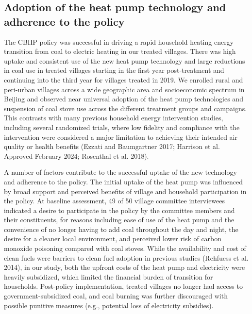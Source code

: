 \documentclass[
  letterpaper,
  DIV=11,
  numbers=noendperiod]{scrartcl}
\begin{document}
\hypertarget{adoption-of-the-heat-pump-technology-and-adherence-to-the-policy}{%
\subsection{Adoption of the heat pump technology and adherence to the
policy}\label{adoption-of-the-heat-pump-technology-and-adherence-to-the-policy}}

The CBHP policy was successful in driving a rapid household heating
energy transition from coal to electric heating in our treated villages.
There was high uptake and consistent use of the new heat pump technology
and large reductions in coal use in treated villages starting in the
first year post-treatment and continuing into the third year for
villages treated in 2019. We enrolled rural and peri-urban villages
across a wide geographic area and socioeconomic spectrum in Beijing and
observed near universal adoption of the heat pump technologies and
suspension of coal stove use across the different treatment groups and
campaigns. This contrasts with many previous household energy
intervention studies, including several randomized trials, where low
fidelity and compliance with the intervention were considered a major
limitation to achieving their intended air quality or health benefits
(Ezzati and Baumgartner 2017; Harrison et al. Approved February 2024;
Rosenthal et al. 2018).

A number of factors contribute to the successful uptake of the new
technology and adherence to the policy. The initial uptake of the heat
pump was influenced by broad support and perceived benefits of village
and household participation in the policy. At baseline assessment, 49 of
50 village committee interviewees indicated a desire to participate in
the policy by the committee members and their constituents, for reasons
including ease of use of the heat pump and the convenience of no longer
having to add coal throughout the day and night, the desire for a
cleaner local environment, and perceived lower risk of carbon monoxide
poisoning compared with coal stoves. While the availability and cost of
clean fuels were barriers to clean fuel adoption in previous studies
(Rehfuess et al. 2014), in our study, both the upfront costs of the heat
pump and electricity were heavily subsidized, which limited the
financial burden of transition for households. Post-policy
implementation, treated villages no longer had access to
government-subsidized coal, and coal burning was further discouraged
with possible punitive measures (e.g., potential loss of electricity
subsidies).
\end{document}

